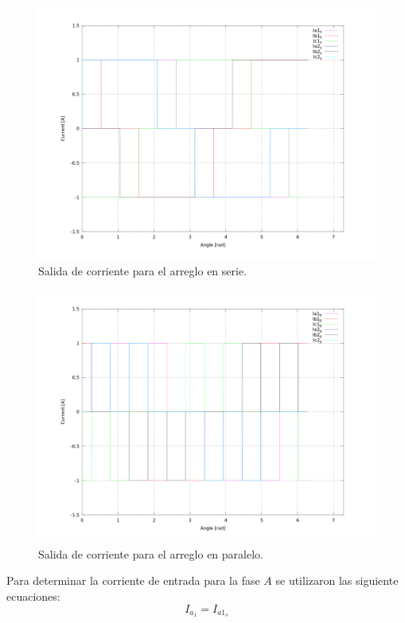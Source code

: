 \documentclass[12pt,graphicx,caption,rotating]{article}
\begin{document}
\begin{figure}[H]
	\centering
		\includegraphics[scale=0.3]{corr_s.png}
	\caption{Salida de corriente para el arreglo en serie.}
	\label{fig6}
\end{figure}
\noindent
\begin{figure}[H]
	\centering
		\includegraphics[scale=0.3]{corr_p.png}
	\caption{Salida de corriente para el arreglo en paralelo.}
	\label{fig7}
\end{figure}
\noindent
Para determinar la corriente de entrada para la fase $A$ se utilizaron las siguiente ecuaciones:
\begin{equation}
 I_{a_1} = I_{a1_s}
 \label{ecu19}
\end{equation}
\end{document}
